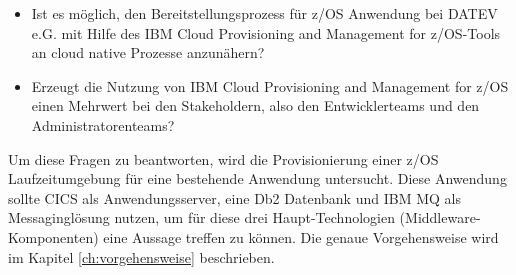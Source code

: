 \begin{samepage}
\begin{itemize}
\item Ist es möglich, den Bereitstellungsprozess für z/OS Anwendung bei DATEV e.G. mit Hilfe des \glqq IBM Cloud Provisioning and Management for z/OS\grqq-Tools an cloud native Prozesse anzunähern?
\item Erzeugt die Nutzung von \glqq IBM Cloud Provisioning and Management for z/OS\grqq{} einen Mehrwert bei den Stakeholdern, also den Entwicklerteams und den Administratorenteams?
\end{itemize}
\end{samepage}

Um diese Fragen zu beantworten, wird die Provisionierung einer z/OS Laufzeitumgebung für eine bestehende Anwendung untersucht.
Diese Anwendung sollte CICS als Anwendungsserver, eine Db2 Datenbank und IBM MQ als Messaginglösung nutzen, um für diese drei Haupt-Technologien (Middleware-Komponenten) eine Aussage treffen zu können.
Die genaue Vorgehensweise wird im Kapitel \ref{ch:vorgehensweise} beschrieben.

